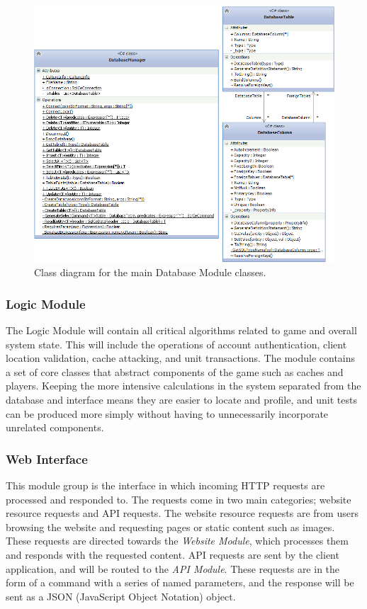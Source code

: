 \begin{figure}[h!]
    \centering
    \includegraphics[width=\textwidth]{dbmancd}
    \caption{Class diagram for the main Database Module classes.}
\end{figure}

\subsubsection{Logic Module}
The Logic Module will contain all critical algorithms related to game and overall system state. This will include the operations of account authentication, client location validation, cache attacking, and unit transactions. The module contains a set of core classes that abstract components of the game such as caches and players. Keeping the more intensive calculations in the system separated from the database and interface means they are easier to locate and profile, and unit tests can be produced more simply without having to unnecessarily incorporate unrelated components.

\subsubsection{Web Interface}
This module group is the interface in which incoming HTTP requests are processed and responded to. The requests come in two main categories; website resource requests and API requests. The website resource requests are from users browsing the website and requesting pages or static content such as images. These requests are directed towards the \emph{Website Module}, which processes them and responds with the requested content. API requests are sent by the client application, and will be routed to the \emph{API Module}. These requests are in the form of a command with a series of named parameters, and the response will be sent as a JSON (JavaScript Object Notation) object.

